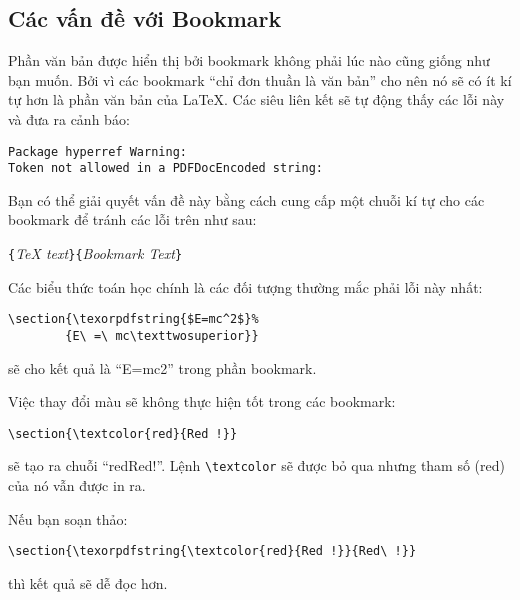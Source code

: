 \subsection{Các vấn đề với Bookmark}
Phần văn bản được hiển thị bởi bookmark không phải lúc nào cũng giống như bạn muốn. Bởi vì các bookmark ``chỉ đơn thuần là văn bản'' cho nên nó sẽ có ít kí tự hơn là phần văn bản của \LaTeX{}. Các siêu liên kết sẽ tự động thấy các lỗi này và đưa ra cảnh báo:
\begin{code}
\begin{verbatim}
Package hyperref Warning:
Token not allowed in a PDFDocEncoded string:
\end{verbatim}
\end{code}
Bạn có thể giải quyết vấn đề này bằng cách cung cấp một chuỗi kí
tự cho các bookmark để tránh các lỗi trên như sau:
\begin{lscommand}
\verb|{|\emph{\TeX{} text}\verb|}{|\emph{Bookmark Text}\verb|}|
\end{lscommand}

Các biểu thức toán học chính là các đối tượng thường mắc phải lỗi này nhất:
\begin{code}
\begin{verbatim}
\section{\texorpdfstring{$E=mc^2$}%
        {E\ =\ mc\texttwosuperior}}
\end{verbatim}
\end{code}
sẽ cho kết quả là ``E=mc2'' trong phần bookmark.

Việc thay đổi màu sẽ không thực hiện tốt trong các bookmark:
\begin{code}
\verb+\section{\textcolor{red}{Red !}}+
\end{code}
\noindent sẽ tạo ra chuỗi ``redRed!''. Lệnh \verb+\textcolor+ sẽ được bỏ qua nhưng tham số (red) của nó vẫn được in ra.

Nếu bạn soạn thảo:
\begin{code}
\verb+\section{\texorpdfstring{\textcolor{red}{Red !}}{Red\ !}}+
\end{code}
thì kết quả sẽ dễ đọc hơn.

